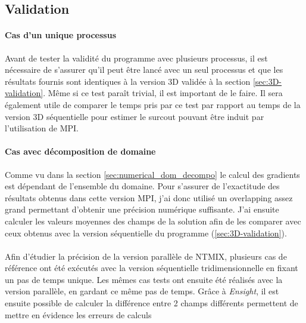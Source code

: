 \subsection{Validation}

\paragraph{Cas d'un unique processus}Avant de tester la validité du programme avec plusieurs processus, il est nécessaire de s'assurer qu'il peut être lancé avec un seul processus et que les résultats fournis sont identiques à la version 3D validée à la section \ref{sec:3D-validation}. Même si ce test paraît trivial, il est important de le faire. Il sera également utile de comparer le temps pris par ce test par rapport au temps de la version 3D séquentielle pour estimer le surcout pouvant être induit par l'utilisation de MPI.

\paragraph{Cas avec décomposition de domaine}
Comme vu dans la section \ref{sec:numerical_dom_decompo} le calcul des gradients est dépendant de l'ensemble du domaine. Pour s'assurer de l'exactitude des résultats obtenus dans cette version MPI, j'ai donc utilisé un overlapping assez grand permettant d'obtenir une précision numérique suffisante. J'ai ensuite calculer les valeurs moyennes des champs de la solution afin de les comparer avec ceux obtenus avec la version séquentielle du programme (\ref{sec:3D-validation}).


 \paragraph{}Afin d'étudier la précision de la version parallèle de NTMIX, plusieurs cas de référence ont été exécutés avec la version séquentielle tridimensionnelle en fixant un pas de temps unique. Les mêmes cas tests ont ensuite été réalisés avec la version parallèle, en gardant ce même pas de temps. Grâce à \textit{Ensight}, il est ensuite possible de calculer la différence entre 2 champs différents permettent de mettre en évidence les erreurs de calculs 


%
%

